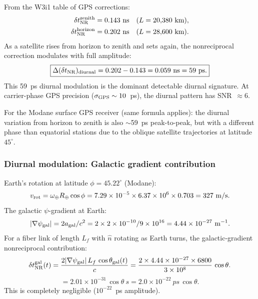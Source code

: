 \documentclass[aps,prd,twocolumn,superscriptaddress,nofootinbib,longbibliography]{revtex4-2}
\begin{document}
From the W3i1 table of GPS corrections:
\begin{align}
\delta t_{\rm NR}^{\rm zenith} &= 0.143\ \si{ns} \quad (L = 20{,}380\ \si{km}), \nonumber\\
\delta t_{\rm NR}^{\rm horizon} &= 0.202\ \si{ns} \quad (L = 28{,}600\ \si{km}).
\end{align}
As a satellite rises from horizon to zenith and sets again, the
nonreciprocal correction modulates with full amplitude:
\begin{equation}
\boxed{
\Delta(\delta t_{\rm NR})_{\rm diurnal} = 0.202 - 0.143 = 0.059\ \si{ns} = 59\ \si{ps}.
}
\end{equation}
This 59~ps diurnal modulation is the dominant detectable
diurnal signature.  At carrier-phase GPS precision
($\sigma_{\rm GPS}\sim10$~ps), the diurnal pattern has SNR~$\approx 6$.

For the Modane surface GPS receiver (same formula applies):
the diurnal variation from horizon to zenith is also $\sim$59~ps
peak-to-peak, but with a different phase than equatorial stations
due to the oblique satellite trajectories at latitude $45^\circ$.

\subsubsection{Diurnal modulation: Galactic gradient contribution}
\label{sec:diurnal-gal}

Earth's rotation at latitude $\phi = 45.22^\circ$ (Modane):
\begin{equation}
v_{\rm rot} = \omega_\oplus R_\oplus\cos\phi
= 7.29\times10^{-5}\times6.37\times10^6\times0.703 = 327\ \si{m/s}.
\end{equation}
The galactic $\psi$-gradient at Earth:
\begin{equation}
|\nabla\psi_{\rm gal}| = 2a_{\rm gal}/c^2
= 2\times2\times10^{-10}/9\times10^{16}
= 4.44\times10^{-27}\ \si{m^{-1}}.
\end{equation}
For a fiber link of length $L_f$ with $\hat{n}$ rotating as Earth
turns, the galactic-gradient nonreciprocal contribution:
\begin{equation}
\delta t_{\rm NR}^{\rm gal}(t)
= \frac{2|\nabla\psi_{\rm gal}|\,L_f\,\cos\theta_{\rm gal}(t)}{c}
= \frac{2\times4.44\times10^{-27}\times6800}{3\times10^8}\,\cos\theta.
\end{equation}
\begin{equation}
= 2.01\times10^{-31}\,\cos\theta\ \si{s} = 2.0\times10^{-22}\ \si{ps}\,\cos\theta.
\end{equation}
This is completely negligible ($10^{-22}$~ps amplitude).
\end{document}
